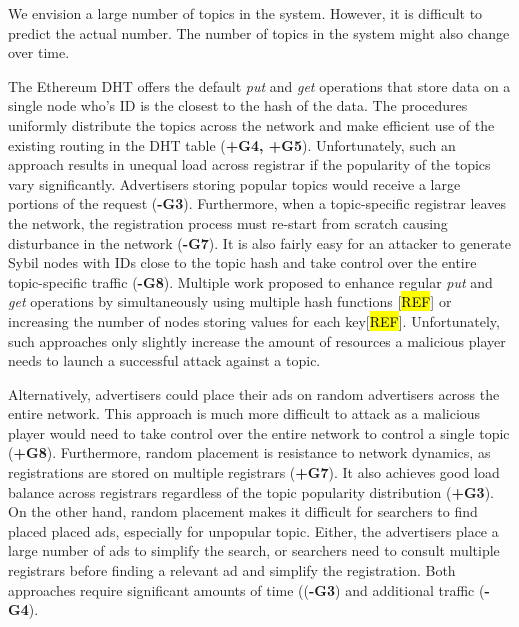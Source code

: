  We envision a large number of topics in the system. However, it is difficult to predict the actual number. The number of topics in the system might also change over time. 

The Ethereum DHT offers the default \emph{put} and \emph{get} operations that store data on a single node who's ID is the closest to the hash of the data. The procedures uniformly distribute the topics across the network and make efficient use of the existing routing in the DHT table (\textbf{+G4, +G5}). Unfortunately, such an approach results in unequal load across registrar if the popularity of the topics vary significantly. Advertisers storing popular topics would receive a large portions of the request (\textbf{-G3}). Furthermore, when a topic-specific registrar leaves the network, the registration process must re-start from scratch causing disturbance in the network (\textbf{-G7}). It is also fairly easy for an attacker to generate Sybil nodes with IDs close to the topic hash and take control over the entire topic-specific traffic (\textbf{-G8}). Multiple work  proposed to enhance regular \emph{put} and \emph{get} operations by simultaneously using multiple hash functions [\hl{REF}] or increasing the number of nodes storing values for each key[\hl{REF}]. Unfortunately, such approaches only slightly increase the amount of resources a malicious player needs to launch a successful attack against a topic. 

Alternatively, advertisers could place their ads on random advertisers across the entire network. This approach is much more difficult to attack as a malicious player would need to take control over the entire network to control a single topic (\textbf{+G8}). Furthermore, random placement is resistance to network dynamics, as registrations are stored on multiple registrars (\textbf{+G7}). It also achieves good load balance across registrars regardless of the topic popularity distribution (\textbf{+G3}). On the other hand, random placement makes it difficult for searchers to find placed placed ads, especially for unpopular topic. Either, the advertisers place a large number of ads to simplify the search, or searchers need to consult multiple registrars before finding a relevant ad and simplify the registration. Both approaches require significant amounts of time ((\textbf{-G3}) and additional traffic (\textbf{-G4}). 

